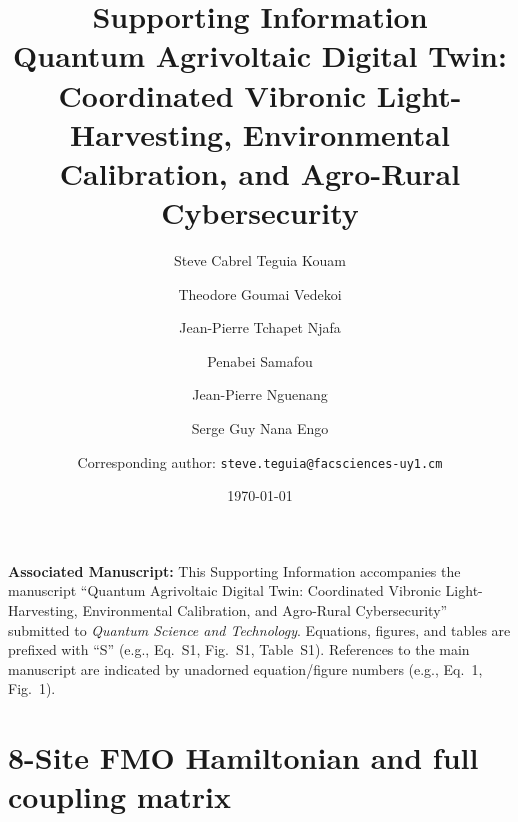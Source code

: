 \documentclass[11pt,a4paper]{article}
\begin{document}
\title{\textbf{Supporting Information}\\[0.5em]
\large Quantum Agrivoltaic Digital Twin: Coordinated Vibronic Light-Harvesting, Environmental Calibration, and Agro-Rural Cybersecurity}

\author{Steve Cabrel Teguia Kouam}
\author{Theodore Goumai Vedekoi}
\author{Jean-Pierre Tchapet Njafa}
\author{Penabei Samafou}
\author{Jean-Pierre Nguenang}
\author{Serge Guy Nana Engo}
\author{Corresponding author: \texttt{steve.teguia@facsciences-uy1.cm}}

\date{\today}

\maketitle

\noindent\textbf{Associated Manuscript:}
This Supporting Information accompanies the manuscript ``Quantum Agrivoltaic Digital Twin: Coordinated Vibronic Light-Harvesting, Environmental Calibration, and Agro-Rural Cybersecurity'' submitted to \textit{Quantum Science and Technology}.
Equations, figures, and tables are prefixed with ``S'' (e.g., Eq.~S1, Fig.~S1, Table~S1).
References to the main manuscript are indicated by unadorned equation/figure numbers (e.g., Eq.~1, Fig.~1).

\vspace{1em}

\tableofcontents

\newpage


\section{8-Site FMO Hamiltonian and full coupling matrix}
\label{SI-sec:hamiltonian}
\end{document}

